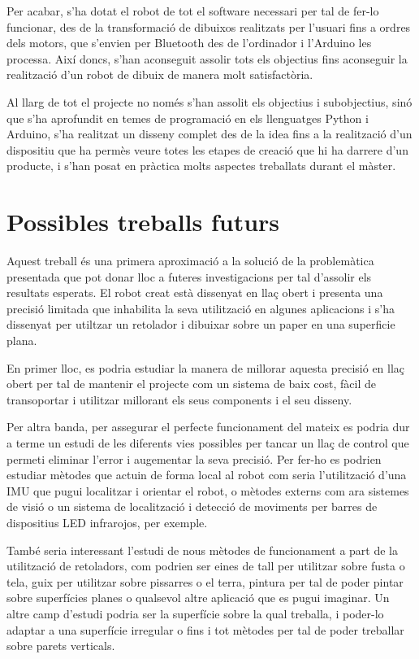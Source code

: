 Per acabar, s'ha dotat el robot de tot el software necessari per tal de fer-lo funcionar, des de la transformació de dibuixos realitzats per l'usuari fins a ordres dels motors, que s'envien per Bluetooth des de l'ordinador i l'Arduino les processa. Així doncs, s'han aconseguit assolir tots els objectius fins aconseguir la realització d'un robot de dibuix de manera molt satisfactòria.

Al llarg de tot el projecte no només s'han assolit els objectius i subobjectius, sinó que s'ha aprofundit en temes de programació en els llenguatges Python i Arduino, s'ha realitzat un disseny complet des de la idea fins a la realització d'un dispositiu que ha permès veure totes les etapes de creació que hi ha darrere d'un producte, i s'han posat en pràctica molts aspectes treballats durant el màster.


\section{Possibles treballs futurs} \label{sec:treballsfuturs}
Aquest treball és una primera aproximació a la solució de la problemàtica presentada que pot donar lloc a futeres investigacions per tal d'assolir els resultats esperats. El robot creat està dissenyat en llaç obert  i presenta una precisió limitada que inhabilita la seva utilització en algunes aplicacions i s'ha dissenyat per utiltzar un retolador i dibuixar sobre un paper  en una superficie plana. 

En primer lloc, es podria estudiar la manera de millorar aquesta precisió en llaç obert per tal de mantenir el projecte com un sistema de baix cost, fàcil de transoportar i utilitzar millorant els seus components i el seu disseny. 

Per altra banda, per assegurar el perfecte funcionament del mateix es podria dur a terme un estudi de les diferents vies possibles per tancar un llaç de control que permeti eliminar l'error i augementar la seva precisió. Per fer-ho es podrien estudiar mètodes que actuin de forma local al robot com seria l'utilització d'una IMU que pugui localitzar i orientar el robot, o mètodes externs com ara sistemes de visió o un sistema de localització i detecció de moviments per barres de dispositius LED infrarojos, per exemple. 

També seria interessant l'estudi de nous mètodes de funcionament a part de la utilització de retoladors, com podrien ser eines de tall per utilitzar sobre fusta o tela, guix per utilitzar sobre pissarres o el terra, pintura per tal de poder pintar sobre superfícies planes o qualsevol altre aplicació que es pugui imaginar. Un altre camp d'estudi podria ser la superfície sobre la qual treballa, i poder-lo adaptar a una superfície irregular o fins i tot mètodes per tal de poder treballar sobre parets verticals. 